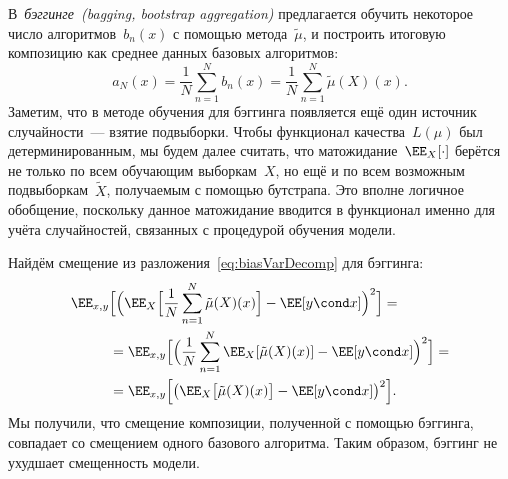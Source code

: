 \documentclass[12pt,fleqn]{article}
\begin{document}
В~\emph{бэггинге~(bagging, bootstrap aggregation)} предлагается обучить некоторое
число алгоритмов~$b_n(x)$ с помощью метода~$\tilde \mu$, и построить итоговую композицию
как среднее данных базовых алгоритмов:
\[
    a_N(x)
    =
    \frac{1}{N}
    \sum_{n = 1}^{N}
        b_n(x)
    =
    \frac{1}{N}
    \sum_{n = 1}^{N}
        \tilde \mu(X)(x).
\]
Заметим, что в методе обучения для бэггинга появляется ещё один источник случайности~---
взятие подвыборки.
Чтобы функционал качества~$L(\mu)$ был детерминированным,
мы будем далее считать, что матожидание~$\EE_X [\cdot]$ берётся
не только по всем обучающим выборкам~$X$,
но ещё и по всем возможным подвыборкам~$\tilde X$,
получаемым с помощью бутстрапа.
Это вполне логичное обобщение, поскольку данное матожидание
вводится в функционал именно для учёта случайностей,
связанных с процедурой обучения модели.

Найдём смещение из разложения~\eqref{eq:biasVarDecomp} для бэггинга:
\begin{align*}
    \EE_{x, y} &\Bigl[
        \Bigl(
            \EE_{X} \Bigl[
                \frac{1}{N}
                \sum_{n = 1}^{N}
                    \tilde \mu(X)(x)
            \Bigr]
            -
            \EE[y \cond x]
        \Bigr)^2
    \Bigr]
    =\\
    &=
    \EE_{x, y} \Bigl[
        \Bigl(
                \frac{1}{N}
                \sum_{n = 1}^{N}
                    \EE_X[ \tilde \mu(X)(x) ]
            -
            \EE[y \cond x]
        \Bigr)^2
    \Bigr]
    =\\
    &=
    \EE_{x, y} \Bigl[
        \bigl(
            \EE_{X} \bigl[
                \tilde \mu(X)(x)
            \bigr]
            -
            \EE[y \cond x]
        \bigr)^2
    \Bigr].
\end{align*}
Мы получили, что смещение композиции, полученной с помощью бэггинга,
совпадает со смещением одного базового алгоритма.
Таким образом, бэггинг не ухудшает смещенность модели.
\end{document}

